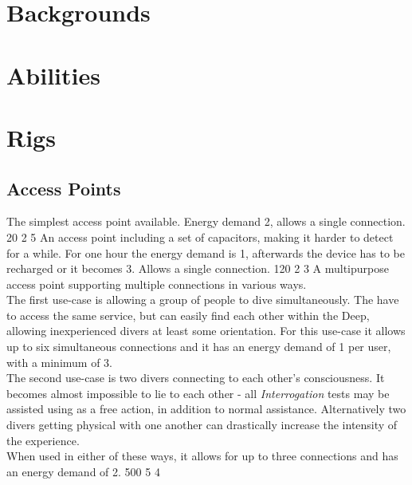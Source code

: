 \section{Backgrounds}

\section{Abilities}

\section{Rigs}
\subsection{Access Points}
\vspace{2mm}
	{The simplest access point available.
		Energy demand 2, allows a single connection.}
	{20}
	{2}
	{5}
	{An access point including a set of capacitors, making it harder to detect for a while.
		For one hour the energy demand is 1, afterwards the device has to be recharged or it becomes 3.
		Allows a single connection.}
	{120}
	{2}
	{3}
	{A multipurpose access point supporting multiple connections in various ways.
		\\%
		The first use-case is allowing a group of people to dive simultaneously.
		The have to access the same service, but can easily find each other within the Deep, allowing inexperienced divers at least some orientation.
		For this use-case it allows up to six simultaneous connections and it has an energy demand of 1 per user, with a minimum of 3.
		\\%
		The second use-case is two divers connecting to each other's consciousness.
		It becomes almost impossible to lie to each other
		- all \emph{Interrogation} tests may be assisted using \emph{\hackingskill} as a free action, in addition to normal assistance.
		Alternatively two divers getting physical with one another can drastically increase the intensity of the experience.
		\\%
		When used in either of these ways, it allows for up to three connections and has an energy demand of 2.}
	{500}
	{5}
	{4}
